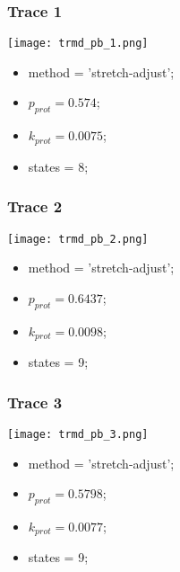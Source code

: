 \subsubsection{Trace 1}
\begin{minipage}[c]{0.7\textwidth}
	\texttt{[image: trmd\_pb\_1.png]}
\end{minipage}
\hfill
\begin{minipage}[c]{0.45\textwidth}
	\begin{itemize}
		\item method = 'stretch-adjust';
		\item $p_{prot}=0.574$;
		\item $k_{prot}=0.0075$;
		\item states = 8;
	\end{itemize}
\end{minipage}

\subsubsection{Trace 2}
\begin{minipage}[c]{0.7\textwidth}
	\texttt{[image: trmd\_pb\_2.png]}
\end{minipage}
\hfill
\begin{minipage}[c]{0.45\textwidth}
	\begin{itemize}
		\item method = 'stretch-adjust';
		\item $p_{prot}=0.6437$;
		\item $k_{prot}=0.0098$;
		\item states = 9;
	\end{itemize}
\end{minipage}

\subsubsection{Trace 3}
\begin{minipage}[c]{0.7\textwidth}
	\texttt{[image: trmd\_pb\_3.png]}
\end{minipage}
\hfill
\begin{minipage}[c]{0.45\textwidth}
	\begin{itemize}
		\item method = 'stretch-adjust';
		\item $p_{prot}=0.5798$;
		\item $k_{prot}=0.0077$;
		\item states = 9;
	\end{itemize}
\end{minipage}

